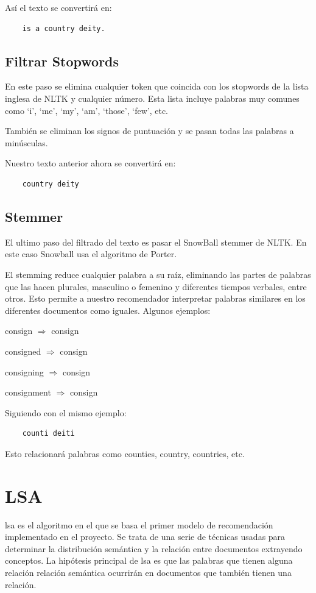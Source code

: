 \documentclass[withindex, glossary]{cam-thesis}
\begin{document}
Así el texto se convertirá en:
\begin{verbatim}
    is a country deity.
\end{verbatim}

\section{Filtrar Stopwords}
En este paso se elimina cualquier token que coincida con los stopwords de la lista inglesa de NLTK\cite{NLTK} y cualquier número. Esta lista incluye palabras muy comunes como `i', `me', `my', `am', `those', `few', etc.

También se eliminan los signos de puntuación y se pasan todas las palabras a minúsculas.

Nuestro texto anterior ahora se convertirá en:
\begin{verbatim}
    country deity
\end{verbatim}

\section{Stemmer}
El ultimo paso del filtrado del texto es pasar el SnowBall\cite{snowball} stemmer de NLTK\cite{NLTK}\@. En este caso Snowball usa el algoritmo de Porter\cite{porter}.

El stemming reduce cualquier palabra a su raíz, eliminando las partes de palabras que las hacen plurales, masculino o femenino y  diferentes tiempos verbales, entre otros. Esto permite a nuestro recomendador interpretar palabras similares en los diferentes documentos como iguales. Algunos ejemplos:

\begin{center}
consign $\Rightarrow$ consign

consigned $\Rightarrow$ consign

consigning $\Rightarrow$ consign

consignment $\Rightarrow$ consign
\end{center}

Siguiendo con el mismo ejemplo:
\begin{verbatim}
    counti deiti
\end{verbatim}

Esto relacionará palabras como counties, country, countries, etc.

\chapter{LSA}\label{chap:lsa}
\acrfull{lsa} es el algoritmo en el que se basa el primer modelo de recomendación implementado en el proyecto. Se trata de una serie de técnicas usadas para determinar la distribución semántica y la relación entre documentos extrayendo conceptos. La hipótesis principal de \acrshort{lsa} es que las palabras que tienen alguna relación relación semántica ocurrirán en documentos que también tienen una relación.
\end{document}
